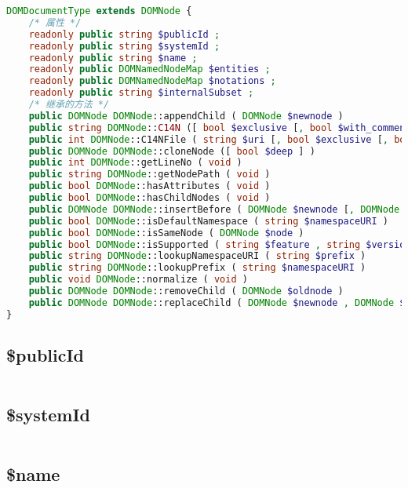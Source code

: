 \begin{lstlisting}[language=PHP]
DOMDocumentType extends DOMNode {
    /* 属性 */
    readonly public string $publicId ;
    readonly public string $systemId ;
    readonly public string $name ;
    readonly public DOMNamedNodeMap $entities ;
    readonly public DOMNamedNodeMap $notations ;
    readonly public string $internalSubset ;
    /* 继承的方法 */
    public DOMNode DOMNode::appendChild ( DOMNode $newnode )
    public string DOMNode::C14N ([ bool $exclusive [, bool $with_comments [, array $xpath [, array $ns_prefixes ]]]] )
    public int DOMNode::C14NFile ( string $uri [, bool $exclusive [, bool $with_comments [, array $xpath [, array $ns_prefixes ]]]] )
    public DOMNode DOMNode::cloneNode ([ bool $deep ] )
    public int DOMNode::getLineNo ( void )
    public string DOMNode::getNodePath ( void )
    public bool DOMNode::hasAttributes ( void )
    public bool DOMNode::hasChildNodes ( void )
    public DOMNode DOMNode::insertBefore ( DOMNode $newnode [, DOMNode $refnode ] )
    public bool DOMNode::isDefaultNamespace ( string $namespaceURI )
    public bool DOMNode::isSameNode ( DOMNode $node )
    public bool DOMNode::isSupported ( string $feature , string $version )
    public string DOMNode::lookupNamespaceURI ( string $prefix )
    public string DOMNode::lookupPrefix ( string $namespaceURI )
    public void DOMNode::normalize ( void )
    public DOMNode DOMNode::removeChild ( DOMNode $oldnode )
    public DOMNode DOMNode::replaceChild ( DOMNode $newnode , DOMNode $oldnode )
}
\end{lstlisting}

\subsection{\$publicId}

\begin{lstlisting}[language=PHP]

\end{lstlisting}


\subsection{\$systemId}



\begin{lstlisting}[language=PHP]

\end{lstlisting}

\subsection{\$name}



